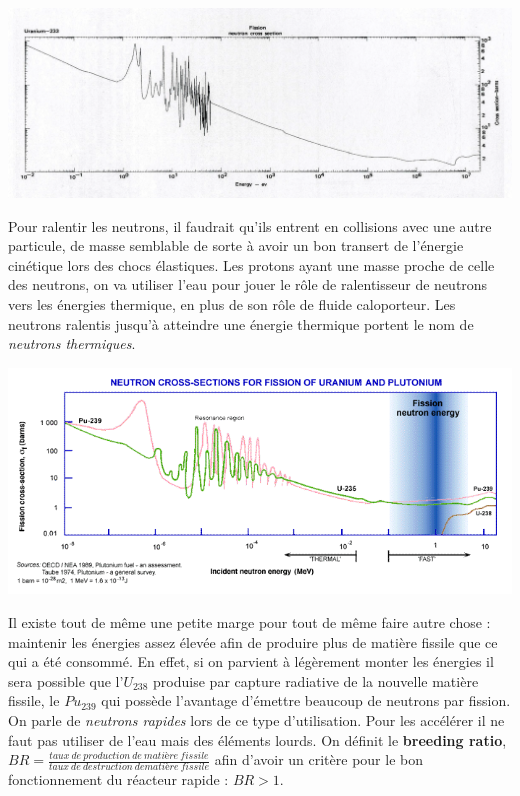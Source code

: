 \begin{center}
	\includegraphics[scale=0.2]{ch1/image4.png}
\end{center}


Pour ralentir les neutrons, il faudrait qu'ils entrent en collisions avec une autre particule, de masse semblable de sorte à avoir
un bon transert de l'énergie cinétique lors des chocs élastiques. Les protons ayant une masse proche de celle des neutrons,
on va utiliser l'eau pour jouer le rôle de ralentisseur de neutrons vers les énergies thermique, en plus de son rôle de fluide
caloporteur. Les neutrons ralentis jusqu'à atteindre une énergie thermique portent le nom de  \textit{neutrons thermiques}.
\newpage

\begin{center}
	\includegraphics[scale=0.67]{ch1/image5.png}
\end{center}

Il existe tout de même une petite marge pour tout de même faire autre chose : maintenir les énergies 
assez élevée afin de produire plus de matière fissile que ce qui a été consommé. En effet, si on 
parvient à légèrement monter les énergies il sera possible que l'$U_{238}$ produise par capture radiative
de la nouvelle matière fissile, le $Pu_{239}$ qui possède l'avantage d'émettre beaucoup de neutrons par fission.
On parle de \textit{neutrons rapides} lors de ce type d'utilisation.
Pour les accélérer il ne faut pas utiliser de l'eau mais des éléments lourds.
On définit le \textbf{breeding ratio}, $BR = \frac{taux\ de\ production\ de\ matière\ fissile}{taux\ de\ destruction\ de
matière\ fissile}$ afin d'avoir un critère pour le bon fonctionnement du réacteur rapide : $BR > 1$.



